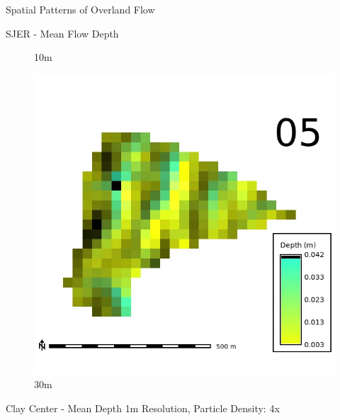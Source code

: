 \documentclass[
  ignorenonframetext,
]{beamer}
\begin{document}
\begin{frame}{Spatial Patterns of Overland Flow}
\begin{block}{SJER - Mean Flow Depth}
\begin{figure}[H]
{}

\caption{10m}

\end{figure}%

\begin{figure}[H]

{\centering \includegraphics{../output/SJER/sensitivity_1/SJER_depth_30_4_s_average.webp}

}

\caption{30m}

\end{figure}%
\end{block}

\begin{block}{Clay Center - Mean Depth}
\label{clay-center---mean-depth}
1m Resolution, Particle Density: 4x


\end{block}
\end{frame}
\end{document}
